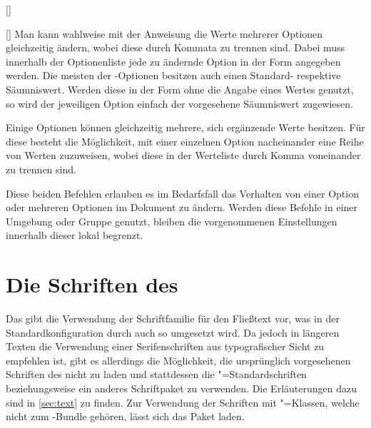 \begin{Declaration*}{}
\begin{Declaration*}{}
\begin{Declaration*}{}
\begin{Declaration}{[]}
\begin{Declaration}{[]}
Man kann wahlweise mit der Anweisung  die Werte mehrerer 
Optionen gleichzeitig ändern, wobei diese durch Kommata zu trennen sind. Dabei 
muss innerhalb der Optionenliste jede zu ändernde Option in der Form 
\PValue{=} angegeben werden. Die meisten der 
\TUDScript-Optionen besitzen auch einen Standard- respektive Säumniswert. 
Werden diese in der Form  ohne die Angabe eines Wertes genutzt, 
so wird der jeweiligen Option einfach der vorgesehene Säumniswert zugewiesen.

Einige Optionen können gleichzeitig mehrere, sich ergänzende Werte besitzen. 
Für diese besteht die Möglichkeit, mit  einer einzelnen Option 
nacheinander eine Reihe von Werten zuzuweisen, wobei diese in der Werteliste 
durch Komma voneinander zu trennen sind.

Diese beiden Befehlen erlauben es im Bedarfsfall das Verhalten von einer Option 
oder mehreren Optionen im Dokument zu ändern. Werden diese Befehle in einer 
Umgebung oder Gruppe genutzt, bleiben die vorgenommenen Einstellungen innerhalb 
dieser lokal begrenzt.
\end{Declaration}
\end{Declaration}



\section{Die Schriften des \CDs}
%
%
%
%
Das \TUDCD gibt die Verwendung der Schriftfamilie \OpenSans für den Fließtext 
vor, was in der Standardkonfiguration durch \TUDScript auch so umgesetzt wird. 
Da jedoch in längeren Texten die Verwendung einer Serifenschriften aus 
typografischer Sicht zu empfehlen ist, gibt es allerdings die Möglichkeit, die 
ursprünglich vorgesehenen Schriften des \CDs nicht zu laden und stattdessen die 
"=Standardschriften beziehungsweise ein anderes Schriftpaket zu 
verwenden. Die Erläuterungen dazu sind in \autoref{sec:text} zu finden. Zur 
Verwendung der Schriften mit "=Klassen, welche nicht zum 
\TUDScript-Bundle gehören, lässt sich das Paket  laden.


\end{Declaration*}
\end{Declaration*}
\end{Declaration*}
